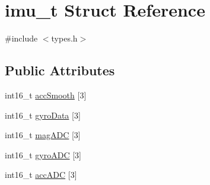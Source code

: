\hypertarget{structimu__t}{\section{imu\-\_\-t Struct Reference}
\label{structimu__t}
}


{\ttfamily \#include $<$types.\-h$>$}

\subsection*{Public Attributes}
\begin{DoxyCompactItemize}
\item 
int16\-\_\-t \hyperlink{structimu__t_ac926eb70490448bbff42b96b836494cc}{acc\-Smooth} \mbox{[}3\mbox{]}
\item 
int16\-\_\-t \hyperlink{structimu__t_adf0174759aab3cd8fa9e83ea2abc56ad}{gyro\-Data} \mbox{[}3\mbox{]}
\item 
int16\-\_\-t \hyperlink{structimu__t_a5508ca86335bde92d3c2ee9168c7c059}{mag\-A\-D\-C} \mbox{[}3\mbox{]}
\item 
int16\-\_\-t \hyperlink{structimu__t_af05a81dcab2ed384ac6890591db08f0c}{gyro\-A\-D\-C} \mbox{[}3\mbox{]}
\item 
int16\-\_\-t \hyperlink{structimu__t_acaa9d196f82fbbc2670209d19f0c19c4}{acc\-A\-D\-C} \mbox{[}3\mbox{]}
\end{DoxyCompactItemize}


